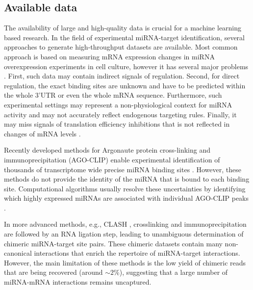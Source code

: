 \documentclass{bmcart}
\begin{document}
\subsection*{Available data}
The availability of large and high-quality data is crucial for a machine learning based research. In the field of experimental miRNA-target identification, several approaches to generate high-throughput datasets are available. Most common approach is based on measuring mRNA expression changes in miRNA overexpression experiments in cell culture, however it has several major problems \cite{li2019current, martinez2013microrna}. First, such data may contain indirect signals of regulation. Second, for direct regulation, the exact binding sites are unknown and have to be predicted within the whole 3'UTR or even the whole mRNA sequence. Furthermore, such experimental settings may represent a non-physiological context for miRNA activity and may not accurately reflect endogenous targeting rules. Finally, it may miss signals of translation efficiency inhibitions that is not reflected in changes of mRNA levels \cite{fabian2010regulation}.

Recently developed methods for Argonaute protein cross-linking and immunoprecipitation (AGO-CLIP) enable experimental identification of thousands of transcriptome wide precise miRNA binding sites \cite{chi2009argonaute, hafner2010transcriptome,zisoulis2010comprehensive}. However, these methods do not provide the identity of the miRNA that is bound to each binding site. Computational algorithms usually resolve these uncertainties by identifying which highly expressed miRNAs are associated with individual AGO-CLIP peaks \cite{majoros2013microrna, reczko2012functional, liu2013clip, khorshid2013biophysical}.

In more advanced methods, e.g., CLASH \cite{helwak2013mapping}, crosslinking and immunoprecipitation are followed by an RNA ligation step, leading to unambiguous determination of chimeric miRNA-target site pairs. These chimeric datasets contain many non-canonical interactions that enrich the repertoire of miRNA-target interactions. However, the main limitation of these methods is the low yield of chimeric reads that are being recovered (around $\sim 2$\%), suggesting that a large number of miRNA-mRNA interactions remains uncaptured. \\
\end{document}
